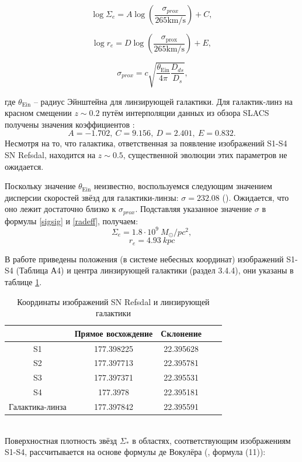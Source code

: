 \begin{equation}\label{sigsig}
\log \Sigma_{e}=A \log \left(\frac{\sigma_{p r o x}}{265  \mathrm{km} / \mathrm{s}}\right)+C,
\end{equation}

\begin{equation}\label{radeff}
\log r_{e}=D \log \left(\frac{\sigma_{\text {prox}}}{265 \mathrm{km} / \mathrm{s}}\right)+E,
\end{equation}

\begin{equation}\label{sigmaprox}
 \ \sigma_{prox}=c \sqrt{\frac{\theta_{\text {Ein}}}{4 \pi} \frac{D_{ds}}{D_{s}}},
\end{equation}

где $\theta_{\text {Ein}}$ -- радиус Эйнштейна для линзирующей галактики. Для галактик-линз на красном смещении $z \sim 0.2$ путём интерполяции данных из обзора SLACS получены значения коэффициентов \cite{schechter2014}: $$ A = -1.702, \ C = 9.156, \ D = 2.401, \ E = 0.832. $$ Несмотря на то, что галактика, ответственная за появление изображений S1-S4 SN Refsdal, находится на $z \sim 0.5$, существенной эволюции этих параметров не ожидается. 


Поскольку значение $\theta_{\text {Ein}}$ неизвестно, воспользуемся следующим значением дисперсии скоростей звёзд для галактики-линзы: $\sigma = 232.08$ (\cite{kawamataoguri}). Ожидается, что оно лежит достаточно близко к $\sigma_{prox}$. Подставляя указанное  значение $\sigma$ в формулы \eqref{sigsig} и \eqref{radeff}, получаем: $$\Sigma_e = 1.8 \cdot 10^9 \ M_{\odot}/pc^2,$$ $$r_e=4.93 \ kpc$$

В работе \cite{kawamataoguri} приведены положения (в системе небесных координат) изображений S1-S4 (Таблица А4) и центра линзирующей галактики (раздел 3.4.4), они указаны в таблице \ref{tab:coord}.

\begin{table}[h!]
  \caption{Координаты изображений SN Refsdal и линзирующей галактики \cite{kawamataoguri}}
  \label{tab:coord}
  \centering
    \begin{tabular}{ | c | c | c | c | c |}
    \hline
     & Прямое восхождение & Склонение \\ \hline
    S1 & 177.398225 & 22.395628 \\ \hline
    S2 & 177.397713 & 22.395781 \\\hline
    S3 & 177.397371 & 22.395531 \\ \hline
    S4 & 177.3978   & 22.395181 \\\hline
    Галактика-линза & 177.397842 & 22.395591 \\\hline
    \end{tabular}
\end{table}
\\
Поверхностная плотность звёзд $\Sigma_*$ в областях, соответствующим изображениям S1-S4, рассчитывается на основе формулы де Вокулёра (\cite{schechter2014}, формула (11)):

